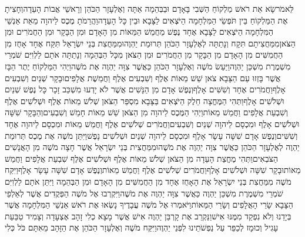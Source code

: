 \documentclass[../main/main.tex]{subfiles}
\begin{document}
\begin{multicols}{\ncols}
לֵּאמֹר\PreVerseSpace{}שָׂא אֵת רֹאשׁ מַלְקוֹחַ הַשְּׁבִי בָּאָדָם וּבַבְּהֵמָה אַתָּה וְאֶלְעָזָר הַכֹּהֵן וְרָאשֵׁי אֲבוֹת הָעֵדָה\PreVerseSpace{}וְחָצִיתָ אֶת הַמַּלְקוֹחַ בֵּין תֹּפְשֵׂי הַמִּלְחָמָה הַיֹּצְאִים לַצָּבָא וּבֵין כָּל הָעֵדָה\PreVerseSpace{}וַהֲרֵמֹתָ מֶכֶס לַיהוָה מֵאֵת אַנְשֵׁי הַמִּלְחָמָה הַיֹּצְאִים לַצָּבָא אֶחָד נֶפֶשׁ מֵחֲמֵשׁ הַמֵּאוֹת מִן הָאָדָם וּמִן הַבָּקָר וּמִן הַחֲמֹרִים וּמִן הַצֹּאן\PreVerseSpace{}מִמַּחֲצִיתָם תִּקָח\SubEnd{} וְנָתַתָּה לְאֶלְעָזָר הַכֹּהֵן תְּרוּמַת יַהְוֶה\PreVerseSpace{}וּמִמַּחֲצִת בְּנֵי יִשְׂרָאֵל תִּקַּח אֶחָד אָחֻז מִן הַחֲמִשִּׁים מִן הָאָדָם מִן הַבָּקָר מִן הַחֲמֹרִים וּמִן הַצֹּאן מִכָּל הַבְּהֵמָה וְנָתַתָּה אֹתָם לַלְוִיִּם שֹׁמְרֵי מִשְׁמֶרֶת מִשְׁכַּן יַהְוֶה\PreVerseSpace{}וַיַּעַשׂ מֹשֶׁה וְאֶלְעָזָר הַכֹּהֵן כַּאֲשֶׁר צִוָּה יַהְוֶה אֶת מֹשֶׁה\PreVerseSpace{}וַיְהִי הַמַּלְקוֹחַ יֶתֶר הַבָּז אֲשֶׁר בָּזְזוּ עַם הַצָּבָא צֹאן שֵׁשׁ מֵאוֹת אֶלֶף וְשִׁבְעִים אֶלֶף וַחֲמֵשֶׁת אֲלָפִים\PreVerseSpace{}וּבָקָר שְׁנַיִם וְשִׁבְעִים אָלֶף\PreVerseSpace{}וַחֲמֹרִים אֶחָד וְשִׁשִּׁים אָלֶף\PreVerseSpace{}וְנֶפֶשׁ אָדָם מִן הַנָּשִׁים אֲשֶׁר לֹא יָדְעוּ מִשְׁכַּב זָכָר כָּל נֶפֶשׁ שְׁנַיִם וּשְׁלֹשִׁים אָלֶף\PreVerseSpace{}וַתְּהִי הַמֶּחֱצָה חֵלֶק הַיֹּצְאִים בַּצָּבָא מִסְפַּר הַצֹּאן שְׁלֹשׁ מֵאוֹת אֶלֶף וּשְׁלֹשִׁים אֶלֶף וְשִׁבְעַת אֲלָפִים וַחֲמֵשׁ מֵאוֹת\PreVerseSpace{}וַיְהִי הַמֶּכֶס לַיהוָה מִן הַצֹּאן שֵׁשׁ מֵאוֹת חָמֵשׁ וְשִׁבְעִים\PreVerseSpace{}וְהַבָּקָר שִׁשָּׁה וּשְׁלֹשִׁים אָלֶף וּמִכְסָם לַיהוָה שְׁנַיִם וְשִׁבְעִים\PreVerseSpace{}וַחֲמֹרִים שְׁלֹשִׁים אֶלֶף וַחֲמֵשׁ מֵאוֹת וּמִכְסָם לַיהוָה אֶחָד וְשִׁשִּׁים\PreVerseSpace{}וְנֶפֶשׁ אָדָם שִׁשָּׁה עָשָׂר אָלֶף וּמִכְסָם לַיהוָה שְׁנַיִם וּשְׁלֹשִׁים נָפֶשׁ\PreVerseSpace{}וַיִּתֵּן מֹשֶׁה אֶת מֶכֶס תְּרוּמַת יַהְוֶה לְאֶלְעָזָר הַכֹּהֵן כַּאֲשֶׁר צִוָּה יַהְוֶה אֶת מֹשֶׁה\PreVerseSpace{}וּמִמַּחֲצִית בְּנֵי יִשְׂרָאֵל אֲשֶׁר חָצָה מֹשֶׁה מִן הָאֲנָשִׁים הַצֹּבְאִים\PreVerseSpace{}וַתְּהִי מֶחֱצַת הָעֵדָה מִן הַצֹּאן שְׁלֹשׁ מֵאוֹת אֶלֶף וּשְׁלֹשִׁים אֶלֶף שִׁבְעַת אֲלָפִים וַחֲמֵשׁ מֵאוֹת\PreVerseSpace{}וּבָקָר שִׁשָּׁה וּשְׁלֹשִׁים אָלֶף\PreVerseSpace{}וַחֲמֹרִים שְׁלֹשִׁים אֶלֶף וַחֲמֵשׁ מֵאוֹת\PreVerseSpace{}וְנֶפֶשׁ אָדָם שִׁשָּׁה עָשָׂר אָלֶף\PreVerseSpace{}וַיִּקַּח מֹשֶׁה מִמַּחֲצִת בְּנֵי יִשְׂרָאֵל אֶת הָאָחֻז אֶחָד מִן הַחֲמִשִּׁים מִן הָאָדָם וּמִן הַבְּהֵמָה וַיִּתֵּן אֹתָם לַלְוִיִּם שֹׁמְרֵי מִשְׁמֶרֶת מִשְׁכַּן יַהְוֶה כַּאֲשֶׁר צִוָּה יַהְוֶה אֶת מֹשֶׁה\PreVerseSpace{}וַיִּקְרְבוּ אֶל מֹשֶׁה הַפְּקֻדִים אֲשֶׁר לְאַלְפֵי הַצָּבָא שָׂרֵי הָאֲלָפִים וְשָׂרֵי הַמֵּאוֹת\PreVerseSpace{}וַיֹּאמְרוּ אֶל מֹשֶׁה עֲבָדֶיךָ נָשְׂאוּ אֶת רֹאשׁ אַנְשֵׁי הַמִּלְחָמָה אֲשֶׁר בְּיָדֵנוּ וְלֹא נִפְקַד מִמֶּנּוּ אִישׁ\PreVerseSpace{}וַנַּקְרֵב אֶת קָרְבַּן יַהְוֶה אִישׁ אֲשֶׁר מָצָא כְלִי זָהָב אֶצְעָדָה וְצָמִיד טַבַּעַת עָגִיל וְכוּמָז לְכַפֵּר עַל נַפְשֹׁתֵינוּ לִפְנֵי יַהְוֶה\PreVerseSpace{}וַיִּקַּח מֹשֶׁה וְאֶלְעָזָר הַכֹּהֵן אֶת הַזָּהָב מֵאִתָּם כֹּל כְּלִי 
\end{multicols}
\end{document}
